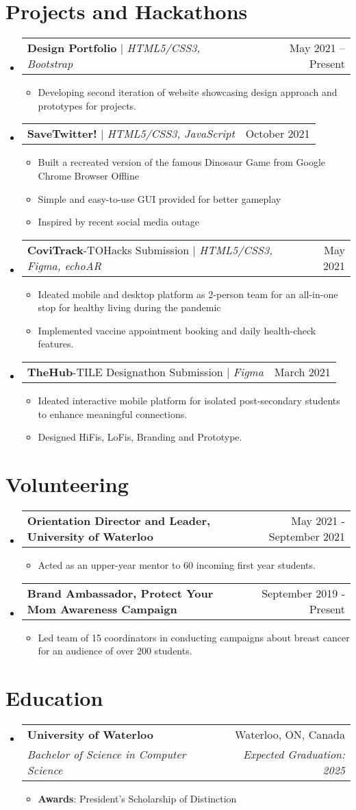 \documentclass[letterpaper,11pt]{article}
\makeatletter
\newcommand{\resumeItem}[1]{
  \item\small{
    {#1 \vspace{-2pt}}
  }
}
\newcommand{\resumeSubheading}[4]{
  \vspace{-2pt}\item
    \begin{tabular*}{0.97\textwidth}[t]{l@{\extracolsep{\fill}}r}
      \textbf{#1} & #2 \\
      \textit{\small#3} & \textit{\small #4} \\
    \end{tabular*}\vspace{-7pt}
}
\newcommand{\resumeProjectHeading}[2]{
    \item
    \begin{tabular*}{0.97\textwidth}{l@{\extracolsep{\fill}}r}
      \small#1 & #2 \\
    \end{tabular*}\vspace{-7pt}
}
\newcommand{\resumeSubHeadingListStart}{\begin{itemize}[leftmargin=0.15in, label={}]}
\newcommand{\resumeSubHeadingListEnd}{\end{itemize}}
\newcommand{\resumeItemListStart}{\begin{itemize}}
\newcommand{\resumeItemListEnd}{\end{itemize}\vspace{-5pt}}
\makeatother
\begin{document}
\section{Projects and Hackathons}
    \resumeSubHeadingListStart
      \resumeProjectHeading
          {\textbf{Design Portfolio} $|$ \emph{HTML5/CSS3, Bootstrap}}{May 2021 -- Present}
          \resumeItemListStart
            \resumeItem{Developing second iteration of website showcasing design approach and prototypes for projects.}
          \resumeItemListEnd
      \resumeProjectHeading
          {\textbf{SaveTwitter!} $|$ \emph{HTML5/CSS3, JavaScript}}{October 2021}
          \resumeItemListStart
            \resumeItem{Built a recreated version of the famous Dinosaur Game from Google Chrome Browser Offline}
            \resumeItem{Simple and easy-to-use GUI provided for better gameplay}
            \resumeItem{Inspired by recent social media outage}
          \resumeItemListEnd
     \resumeProjectHeading
          {\textbf{CoviTrack}-TOHacks Submission $|$ \emph{HTML5/CSS3, Figma, echoAR}}{May 2021}
          \resumeItemListStart
            \resumeItem{Ideated mobile and desktop platform as 2-person team for an all-in-one stop for healthy living during the pandemic}
            \resumeItem{Implemented vaccine appointment booking and daily health-check features.}
          \resumeItemListEnd
     \resumeProjectHeading
          {\textbf{TheHub}-TILE Designathon Submission $|$ \emph{Figma}}{March 2021}
          \resumeItemListStart
            \resumeItem{Ideated interactive mobile platform for isolated post-secondary students to enhance meaningful connections.}
            \resumeItem{Designed HiFis, LoFis, Branding and Prototype.}
          \resumeItemListEnd
    \resumeSubHeadingListEnd

\section{Volunteering}
  \resumeSubHeadingListStart
    \resumeProjectHeading
      {\textbf {Orientation Director and Leader, University of Waterloo}}{May 2021 - September 2021}
      \resumeItemListStart
            \resumeItem{Acted as an upper-year mentor to 60 incoming first year students.}
          \resumeItemListEnd
    \resumeProjectHeading
      {\textbf {Brand Ambassador, Protect Your Mom Awareness Campaign}}{September 2019 - Present}
      \resumeItemListStart
            \resumeItem{Led team of 15 coordinators in conducting campaigns about breast cancer for an audience of over 200 students.}
          \resumeItemListEnd
  \resumeSubHeadingListEnd


\section{Education}
  \resumeSubHeadingListStart
    \resumeSubheading
      {University of Waterloo}{Waterloo, ON, Canada}
      {Bachelor of Science in Computer Science}{Expected Graduation: 2025}
      \resumeItemListStart
            \resumeItem{\textbf {Awards}: President’s Scholarship of Distinction}
          \resumeItemListEnd
  \resumeSubHeadingListEnd
\end{document}

